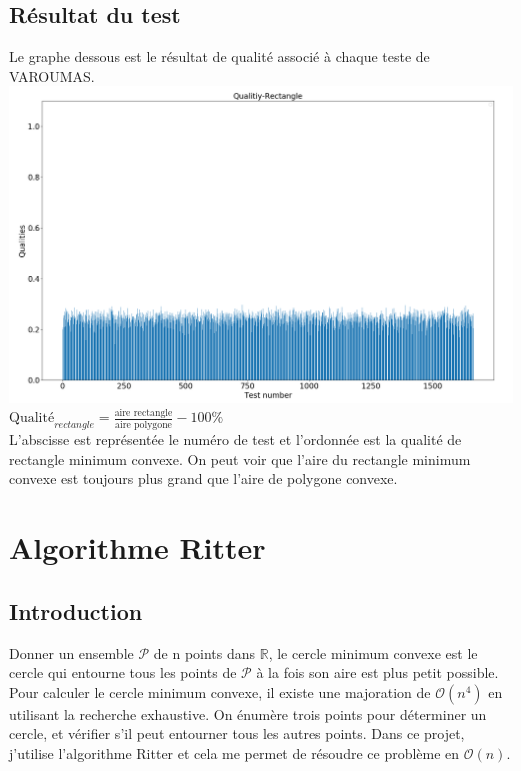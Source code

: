 \documentclass[14px]{article}
\begin{document}
\subsection{Résultat du test}
Le graphe dessous est le résultat de qualité associé à chaque teste de VAROUMAS.\\
\includegraphics[width=\textwidth]{testQualities_Rectangle.png}\\
$\text{Qualité}_{rectangle} = \frac{\text{aire rectangle}}{\text{aire polygone}} - 100\%$\\
L'abscisse est représentée le numéro de test et l'ordonnée est la qualité de rectangle minimum convexe.
On peut voir que l'aire du rectangle minimum convexe est toujours plus grand que l'aire de polygone convexe.

\clearpage


\section{Algorithme Ritter}
\subsection{Introduction}
Donner un ensemble $\mathcal{P}$ de n points dans $\mathbb{R}$, le cercle minimum convexe est le cercle qui entourne tous les points de $\mathcal{P}$ à la fois son aire est plus petit possible.\\
Pour calculer le cercle minimum convexe, il existe une majoration de $\mathcal{O}(n^4)$ en utilisant la recherche exhaustive. On énumère trois points pour déterminer un cercle, et vérifier s'il peut entourner tous les autres points.
Dans ce projet, j'utilise l'algorithme Ritter et cela me permet de résoudre ce problème en $\mathcal{O}(n)$.
\end{document}
